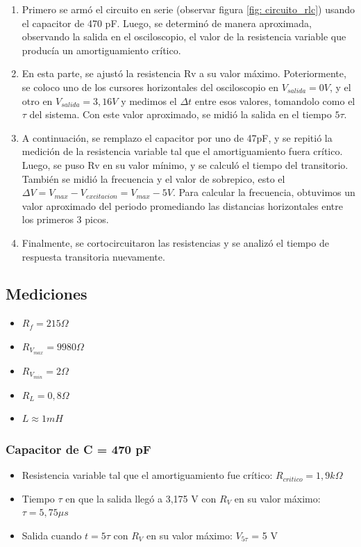 \documentclass{article}
\begin{document}
    \begin{enumerate}
        \item Primero se armó el circuito en serie (observar figura \ref{fig: circuito_rlc}) usando el capacitor de 470 pF. Luego, se determinó de manera aproximada, observando la salida en el osciloscopio, el valor de la resistencia variable que producía un amortiguamiento crítico.
        \item En esta parte, se ajustó la resistencia Rv a su valor máximo. Poteriormente, se coloco uno de los cursores horizontales del osciloscopio en $ V_{salida}=0 V$, y el otro en $ V_{salida}=3,16 V$ y medimos el $ \Delta t $ entre esos valores, tomandolo como el $\tau$ del sistema. Con este valor aproximado, se midió la salida en el tiempo $ 5\tau$.
        \item A continuación, se remplazo el capacitor por uno de 47pF, y se repitió la medición de la resistencia variable tal que el amortiguamiento fuera crítico. Luego, se puso Rv en su valor mínimo, y se calculó el tiempo del transitorio. También se midió la frecuencia y el valor de sobrepico, esto el $ \Delta V = V_{max} - V_{excitacion} = V_{max} - 5 V $. Para calcular la frecuencia, obtuvimos un valor aproximado del periodo promediando las distancias horizontales entre los primeros 3 picos.
        \item Finalmente, se cortocircuitaron las resistencias y se analizó el tiempo de respuesta transitoria nuevamente.
        
    \end{enumerate}
    \subsection{Mediciones}
 
        \begin{itemize}
            \item $ R_f = 215 \Omega $
            \item $ R_{V_{max}} = 9980 \Omega $
            \item $ R_{V_{min}} = 2 \Omega $
            \item $ R_L = 0,8 \Omega $
            \item $ L \approx 1 mH $
        \end{itemize}
        
        \par
        \subsubsection*{Capacitor de C = 470 pF}
            \begin{itemize}
                \item Resistencia variable tal que el amortiguamiento fue crítico: $ R_{critico} = 1,9 k\Omega $ %
                \item Tiempo $\tau$ en que la salida llegó a 3,175 V con $ R_V $ en su valor máximo: $ \tau = 5,75 \mu s$ %
                \item Salida cuando $t=5\tau$ con $ R_V $ en su valor máximo: $V_{5\tau}$ = 5 V%
            \end{itemize}
\end{document}
